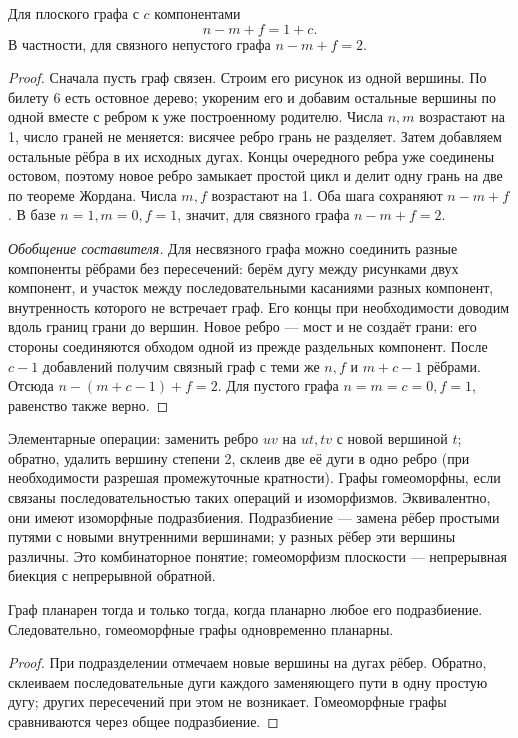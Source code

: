 \begin{theorem}
Для плоского графа с \(c\) компонентами
\[
 \boxed{n-m+f=1+c.}
\]
В частности, для связного непустого графа \(n-m+f=2\).
\end{theorem}
\begin{proof}
Сначала пусть граф связен. Строим его рисунок из одной вершины.
По билету 6 есть остовное дерево; укореним его и добавим остальные
вершины по одной вместе с ребром к уже построенному родителю.
Числа \(n,m\) возрастают на 1, число граней не меняется: висячее ребро
грань не разделяет. Затем добавляем остальные рёбра в их исходных дугах.
Концы очередного ребра уже соединены остовом, поэтому новое ребро
замыкает простой цикл и делит одну грань на две по теореме Жордана.
Числа \(m,f\) возрастают на 1. Оба шага сохраняют \(n-m+f\).
В базе \(n=1,m=0,f=1\), значит, для связного графа \(n-m+f=2\).

\textit{Обобщение составителя.} Для несвязного графа можно соединить разные компоненты рёбрами без
пересечений: берём дугу между рисунками двух компонент, и участок между
последовательными касаниями разных компонент, внутренность которого
не встречает граф. Его концы при необходимости доводим вдоль границ
грани до вершин. Новое ребро — мост и не создаёт грани: его стороны
соединяются обходом одной из прежде раздельных компонент.
После \(c-1\) добавлений получим связный граф с теми же \(n,f\)
и \(m+c-1\) рёбрами. Отсюда \(n-(m+c-1)+f=2\).
Для пустого графа \(n=m=c=0,f=1\), равенство также верно.
\end{proof}
\begin{definition}
Элементарные операции: заменить ребро \(uv\) на \(ut,tv\) с новой
вершиной \(t\); обратно, удалить вершину степени 2, склеив две её дуги
в одно ребро (при необходимости разрешая промежуточные кратности).
Графы гомеоморфны, если связаны последовательностью таких операций
и изоморфизмов. Эквивалентно, они имеют изоморфные подразбиения.
Подразбиение — замена рёбер простыми путями с новыми внутренними
вершинами; у разных рёбер эти вершины различны. Это комбинаторное понятие;
гомеоморфизм плоскости — непрерывная биекция с непрерывной обратной.
\end{definition}


\begin{theorem}
Граф планарен тогда и только тогда, когда планарно любое его подразбиение.
Следовательно, гомеоморфные графы одновременно планарны.
\end{theorem}
\begin{proof}
При подразделении отмечаем новые вершины на дугах рёбер. Обратно,
склеиваем последовательные дуги каждого заменяющего пути в одну простую
дугу; других пересечений при этом не возникает. Гомеоморфные графы
сравниваются через общее подразбиение.
\end{proof}

\endgroup
